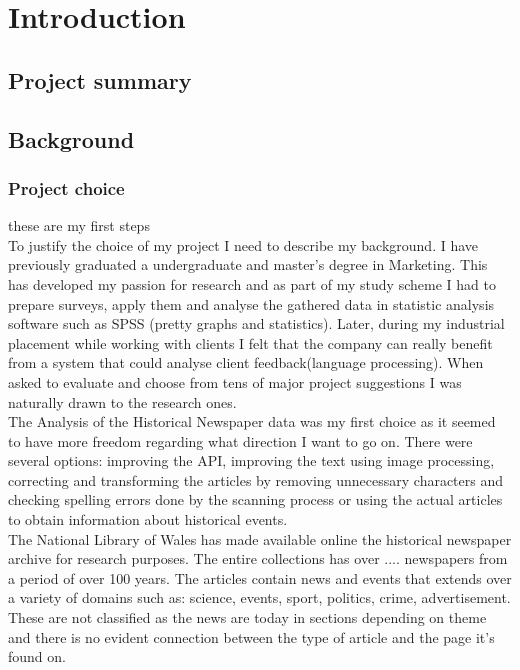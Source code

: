 \documentclass[a4paper, 12pt]{report}
\begin{document}
\tableofcontents
\newpage
\chapter{Introduction}
\section{Project summary}
\section{Background}
\subsection{Project choice}
these are my first steps\cite{MLpaper}\\
To justify the choice of my project I need to describe my background. I have previously graduated a undergraduate and master's degree in Marketing. This has developed my passion for research and as part of my study scheme I had to prepare surveys, apply them and analyse the gathered data in statistic analysis software such  as SPSS (pretty graphs and statistics). Later, during my industrial placement while working with clients I felt that the company can really benefit from a system that could analyse client feedback(language processing).  When asked to evaluate and choose from tens of major project suggestions I was naturally drawn to the research ones. \\

The Analysis of the Historical Newspaper data was my first choice as it seemed to have more freedom regarding what direction I want to go on. There were several options: improving the API, improving the text using image processing, correcting and transforming the articles by removing unnecessary characters and checking spelling errors done by the scanning process or using the actual articles to obtain information about historical events.\\

The National Library of Wales has made available online the historical newspaper archive for research purposes. The entire collections has over .... newspapers from a period of over 100 years. 
The articles contain news and events that extends over a variety of domains such as: science, events, sport, politics, crime, advertisement. These are not classified as the news are today in sections depending on theme and there is no evident connection between the type of article and the page it's found on.\\
\end{document}
